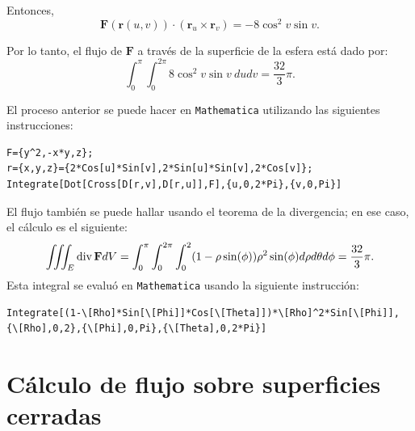 Entonces,
\[
\mathbf{F}\left( \mathbf{r}\left( u,v\right) \right) \cdot \left( \mathbf{r}_{u} \times \mathbf{r}_{v} \right) = -8\cos^{2}v\sin v.
\]

Por lo tanto, el flujo de \(\mathbf{F}\) a través de la superficie de la esfera está dado por:
\[
\int_{0}^{\pi} \int_{0}^{2\pi} 8\cos^{2}v\sin v\ dudv = \frac{32}{3}\pi.
\]

El proceso anterior se puede hacer en \verb"Mathematica" utilizando las siguientes instrucciones:

\begin{tcolorbox}[title=\bf Instrucción \verb"Mathematica"]\begin{Verbatim}[formatcom=\letraverbatim]
F={y^2,-x*y,z};
r={x,y,z}={2*Cos[u]*Sin[v],2*Sin[u]*Sin[v],2*Cos[v]};
Integrate[Dot[Cross[D[r,v],D[r,u]],F],{u,0,2*Pi},{v,0,Pi}]
\end{Verbatim}
\end{tcolorbox}

El flujo también se puede hallar usando el teorema de la divergencia; en ese caso, el cálculo es el siguiente:
\begin{gather*}
\iiint_E {\rm div} \,{\bf F} dV= \int _0^{\pi}\int _0^{2\pi}\int _0^{2} (1-\rho \sin (\phi))\rho^2\sin(\phi)d\rho d\theta d\phi = \frac{32}{3} \pi.
\end{gather*}
Esta integral se evaluó en \verb"Mathematica" usando la siguiente instrucción:

\begin{tcolorbox}[title=\bf Instrucción \verb"Mathematica"]\begin{Verbatim}[formatcom=\letraverbatim]
Integrate[(1-\[Rho]*Sin[\[Phi]]*Cos[\[Theta]])*\[Rho]^2*Sin[\[Phi]],
{\[Rho],0,2},{\[Phi],0,Pi},{\[Theta],0,2*Pi}]
\end{Verbatim}
\end{tcolorbox}

\section{Cálculo de flujo sobre superficies cerradas}

